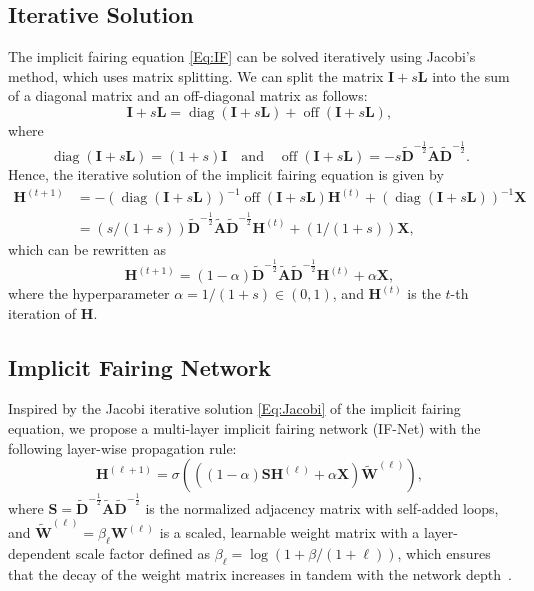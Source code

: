 \documentclass{bmvc2k}
\newcommand{\op}[1]{\operatorname{#1}}
\begin{document}
\subsection{Iterative Solution}
The implicit fairing equation \eqref{Eq:IF} can be solved iteratively using Jacobi's method, which uses matrix splitting. We can split the matrix $\bm{I}+s\bm{L}$ into the sum of a diagonal matrix and an off-diagonal matrix as follows:
\begin{equation}
\bm{I}+s\bm{L}=\op{diag}(\bm{I}+s\bm{L})+\op{off}(\bm{I}+s\bm{L}),
\end{equation}
where
$$\op{diag}(\bm{I}+s\bm{L})=(1+s)\bm{I} \quad \text{and}\quad \op{off}(\bm{I}+s\bm{L})=-s\tilde{\bm{D}}^{-\frac{1}{2}}\tilde{\bm{A}}\tilde{\bm{D}}^{-\frac{1}{2}}.$$
Hence, the iterative solution of the implicit fairing equation is given by
\begin{equation}
\begin{split}
\bm{H}^{(t+1)}
&=-(\op{diag}(\bm{I}+s\bm{L}))^{-1}\op{off}(\bm{I}+s\bm{L})\bm{H}^{(t)} + (\op{diag}(\bm{I}+s\bm{L}))^{-1}\bm{X}\\
&=(s/(1+s))\tilde{\bm{D}}^{-\frac{1}{2}}\tilde{\bm{A}}\tilde{\bm{D}}^{-\frac{1}{2}}\bm{H}^{(t)}+(1/(1+s))\bm{X},
\end{split}
\label{Eq:ISJ}
\end{equation}
which can be rewritten as
\begin{equation}
\bm{H}^{(t+1)}=(1-\alpha)\tilde{\bm{D}}^{-\frac{1}{2}}\tilde{\bm{A}}\tilde{\bm{D}}^{-\frac{1}{2}}\bm{H}^{(t)}+\alpha\bm{X},
\label{Eq:Jacobi}
\end{equation}
where the hyperparameter $\alpha=1/(1+s)\in (0,1)$, and $\bm{H}^{(t)}$ is the $t$-th iteration of $\bm{H}$.

\subsection{Implicit Fairing Network}
Inspired by the Jacobi iterative solution \eqref{Eq:Jacobi} of the implicit fairing equation, we propose a multi-layer implicit fairing network (IF-Net) with the following layer-wise propagation rule:
\begin{equation}
\bm{H}^{(\ell+1)}=\sigma(((1-\alpha)\bm{S}\bm{H}^{(\ell)}+\alpha\bm{X})\tilde{\bm{W}}^{(\ell)}),
\label{Eq:IFNet}
\end{equation}
where $\bm{S}=\tilde{\bm{D}}^{-\frac{1}{2}}\tilde{\bm{A}}\tilde{\bm{D}}^{-\frac{1}{2}}$ is the normalized adjacency matrix with self-added loops, and $\tilde{\bm{W}}^{(\ell)}=\beta_{\ell}\bm{W}^{(\ell)}$ is a scaled, learnable weight matrix with a layer-dependent scale factor defined as $\beta_{\ell}=\log(1+\beta/(1+\ell))$, which ensures that the decay of the weight matrix increases in tandem with the network depth~\cite{chen2020simple}.
\end{document}
